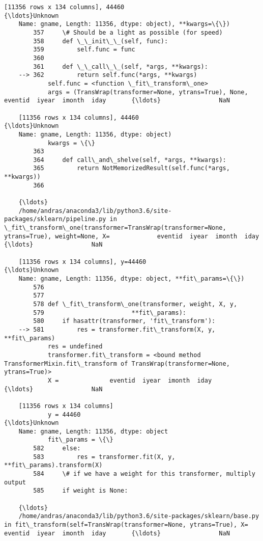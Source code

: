 \documentclass[11pt]{article}
\begin{document}
\begin{Verbatim}[commandchars=\\\{\}]
    [11356 rows x 134 columns], 44460                                           {\ldots}Unknown
    Name: gname, Length: 11356, dtype: object), **kwargs=\{\})
        357     \# Should be a light as possible (for speed)
        358     def \_\_init\_\_(self, func):
        359         self.func = func
        360 
        361     def \_\_call\_\_(self, *args, **kwargs):
    --> 362         return self.func(*args, **kwargs)
            self.func = <function \_fit\_transform\_one>
            args = (TransWrap(transformer=None, ytrans=True), None,              eventid  iyear  imonth  iday       {\ldots}                NaN  
    
    [11356 rows x 134 columns], 44460                                           {\ldots}Unknown
    Name: gname, Length: 11356, dtype: object)
            kwargs = \{\}
        363 
        364     def call\_and\_shelve(self, *args, **kwargs):
        365         return NotMemorizedResult(self.func(*args, **kwargs))
        366 
    
    {\ldots}
    /home/andras/anaconda3/lib/python3.6/site-packages/sklearn/pipeline.py in \_fit\_transform\_one(transformer=TransWrap(transformer=None, ytrans=True), weight=None, X=             eventid  iyear  imonth  iday       {\ldots}                NaN  
    
    [11356 rows x 134 columns], y=44460                                           {\ldots}Unknown
    Name: gname, Length: 11356, dtype: object, **fit\_params=\{\})
        576 
        577 
        578 def \_fit\_transform\_one(transformer, weight, X, y,
        579                        **fit\_params):
        580     if hasattr(transformer, 'fit\_transform'):
    --> 581         res = transformer.fit\_transform(X, y, **fit\_params)
            res = undefined
            transformer.fit\_transform = <bound method TransformerMixin.fit\_transform of TransWrap(transformer=None, ytrans=True)>
            X =              eventid  iyear  imonth  iday       {\ldots}                NaN  
    
    [11356 rows x 134 columns]
            y = 44460                                           {\ldots}Unknown
    Name: gname, Length: 11356, dtype: object
            fit\_params = \{\}
        582     else:
        583         res = transformer.fit(X, y, **fit\_params).transform(X)
        584     \# if we have a weight for this transformer, multiply output
        585     if weight is None:
    
    {\ldots}
    /home/andras/anaconda3/lib/python3.6/site-packages/sklearn/base.py in fit\_transform(self=TransWrap(transformer=None, ytrans=True), X=             eventid  iyear  imonth  iday       {\ldots}                NaN  
    

\end{Verbatim}
\end{document}
